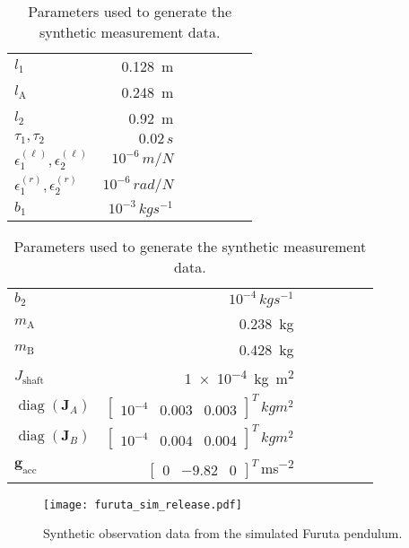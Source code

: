 \documentclass[preprint,12pt]{elsarticle}
\let\vec\bm
\let\mat\mathbf
\DeclareMathOperator*{\diag}{diag}
\numberwithin{equation}{section}
\def\tA{\text{A}}
\def\tB{\text{B}}
\begin{document}
\begin{table}
\caption{Parameters used to generate the synthetic measurement data.}
\label{tab:furuta_sim_parameters}
\centering
\begin{tabular}{l|rrrrr|r}
    \midrule
    $l_1$ & \SI{0.128}{m} \\
    $l_\tA$ & \SI{0.248}{m} \\
    $l_2$ & \SI{0.92}{m} \\
    $\tau_1, \tau_2$ & $0.02\,\si{s}$ \\
    $\epsilon_1^{(\ell)}, \epsilon_2^{(\ell)}$ & $10^{-6}\,\si{m/N}$ \\
    $\epsilon_1^{(r)}, \epsilon_2^{(r)}$ & $10^{-6}\,\si{rad/N}$ \\
    $b_{1}$ & $10^{-3}\,\si{kg s^{-1}}$ \\
    \bottomrule
    \end{tabular}
    \begin{tabular}{l|rrrrr|r}
        \midrule
        $b_{2}$ & $10^{-4}\,\si{kg s^{-1}}$ \\
        $m_\tA$ & \SI{0.238}{kg} \\
        $m_\tB$ & \SI{0.428}{kg} \\
        $J_{\text{shaft}}$ & \SI{1e-4}{kg m^2} \\
        $\diag{(\mat{J}_{A})}$ & $\begin{bmatrix}
            10^{-4} & 0.003 & 0.003
        \end{bmatrix}^T\,\si{kg m^2}$ \\
        $\diag{(\mat{J}_{B})}$ & $\begin{bmatrix}
            10^{-4} & 0.004 & 0.004
        \end{bmatrix}^T\,\si{kg m^2}$ \\
        $\vec{g}_{\text{acc}}$ & $\begin{bmatrix}
            0 & -9.82 & 0
        \end{bmatrix}^T$\,\si{ms^{-2}} \\
        \bottomrule
        \end{tabular}
\end{table}

\begin{figure}[ht]
    \centering
    \texttt{[image: furuta\_sim\_release.pdf]}
    \caption{Synthetic observation data from the simulated Furuta pendulum.}
    \label{fig:furuta_realease_sim}
\end{figure}
\end{document}
